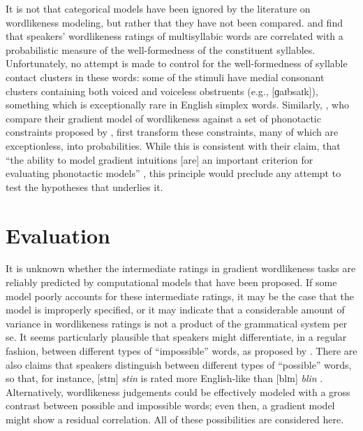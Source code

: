It is not that categorical models have been ignored by the literature on wordlikeness modeling, but rather that they have not been compared. 
\citet{Frisch2000} and \citet{Vitevitch1997} find that speakers' wordlikeness ratings of multisyllabic words are correlated with a probabilistic measure of the well-formedness of the constituent syllables. 
Unfortunately, no attempt is made to control for the well-formedness of syllable contact clusters in these words: some of the stimuli have medial consonant clusters containing both voiced and voiceless obstruents (e.g., [ɡaɪbsaɪk]), something which is exceptionally rare in English simplex words.
Similarly, \citet{Hayes2008a}, who compare their gradient model of wordlikeness against a set of phonotactic constraints proposed by \citet{Clements1983}, first transform these constraints, many of which are exceptionless, into probabilities. 
While this is consistent with their claim, that ``the ability to model gradient intuitions [are] an important criterion for evaluating phonotactic models'' \citep[382]{Hayes2008a}, this principle would preclude any attempt to test the hypotheses that underlies it.


\section{Evaluation}
\label{2evaluation}

It is unknown whether the intermediate ratings in gradient wordlikeness tasks are reliably predicted by computational models that have been proposed. 
If some model poorly accounts for these intermediate ratings, it may be the case that the model is improperly specified, or it may indicate that a considerable amount of variance in wordlikeness ratings is not a product of the grammatical system per se. 
It seems particularly plausible that speakers might differentiate, in a regular fashion, between different types of ``impossible'' words, as proposed by \citet{SPE}. 
There are also claims that speakers distinguish between different types of ``possible'' words, so that, for instance, [stɪn] \emph{stin} is rated more English-like than [blɪn] \emph{blin} \citep{Albright2009a}. 
Alternatively, wordlikeness judgements could be effectively modeled with a gross contrast between possible and impossible words; even then, a gradient model might show a residual correlation.
All of these possibilities are considered here.

